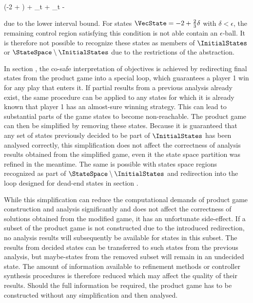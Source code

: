     \startformula
        \startalign[n=3,align={middle,right,left}]
            \NC \empty
             \Big({-2} +  \delta\Big) + \VecControl_t + 
            \NC \subseteq {}
            \NR
            \NC \Leftrightarrow \quad
            \NC {}
            \NC \subseteq {}
            \NR
            \NC \Rightarrow \quad
            \NC \VecControl_t
            \NC {} - \delta
            \NR
        \stopalign
    \stopformula

    due to the lower interval bound.
    For states $\VecState = -2 + \frac{2}{3} \delta$ with $\delta < \epsilon$, the remaining control region satisfying this condition is not able contain an $\epsilon$-ball.
    It is therefore not possible to recognize these states as members of $\InitialStates$ or $\StateSpace \setminus \InitialStates$ due to the restrictions of the abstraction.

\stopsubsection


\startsubsection[title={Product Game Simplification},reference=sec:abstraction-analysis-simplification]

    In section , the co-safe interpretation of objectives is achieved by redirecting final states from the product game into a special loop, which guarantees a player 1 win for any play that enters it.
    If partial results from a previous analysis already exist, the same procedure can be applied to any states for which it is already known that player 1 has an almost-sure winning strategy.
    This can lead to substantial parts of the game states to become non-reachable.
    The product game can then be simplified by removing these states.
    Because it is guaranteed that any set of states previously decided to be part of $\InitialStates$ has been analysed correctly, this simplification does not affect the correctness of analysis results obtained from the simplified game, even it the state space partition was refined in the meantime.
    The same is possible with states space regions recognized as part of $\StateSpace \setminus \InitialStates$ and redirection into the loop designed for dead-end states in section .

    While this simplification can reduce the computational demands of product game construction and analysis significantly and does not affect the correctness of solutions obtained from the modified game, it has an unfortunate side-effect.
    If a subset of the product game is not constructed due to the introduced redirection, no analysis results will subsequently be available for states in this subset.
    The results from decided states can be transferred to such states from the previous analysis, but maybe-states from the removed subset will remain in an undecided state.
    The amount of information available to refinement methods or controller synthesis procedures is therefore reduced which may affect the quality of their results.
    Should the full information be required, the product game has to be constructed without any simplification and then analysed.

\stopsubsection

